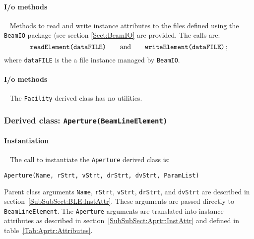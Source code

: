 \paragraph{I/o methods} ~\newline
\noindent
Methods to read and write instance attributes to the files defined
using the \texttt{BeamIO} package (see section \ref{Sect:BeamIO} are
provided.
The calls are:
\begin{equation}
  \texttt{readElement(dataFILE)} \quad \quad {\rm and }
      \quad \quad \texttt{writeElement(dataFILE)} \,; \nonumber
\end{equation}
where \texttt{dataFILE} is the a file instance managed by \texttt{BeamIO}.

\paragraph{I/o methods} ~\newline
\noindent
The \texttt{Facility} derived class has no utilities.

\FloatBarrier

\subsubsection{Derived class: \texttt{Aperture(BeamLineElement)}}

\paragraph{Instantiation} ~\newline
\noindent
The call to instantiate the \texttt{Aperture} derived class is:
\begin{center}
  \texttt{Aperture(Name, rStrt, vStrt, drStrt, dvStrt, ParamList)}
\end{center}
Parent class arguments \texttt{Name}, \texttt{rStrt}, \texttt{vStrt},
\texttt{drStrt}, and \texttt{dvStrt} are described in
section~\ref{SubSubSect:BLE:InstAttr}.
These arguments are passed directly to \texttt{BeamLineElement}.
The \texttt{Aperture} arguments are translated into instance
attributes as described in section~\ref{SubSubSect:Aprtr:InstAttr} and
defined in table~\ref{Tab:Aprtr:Attributes}.


